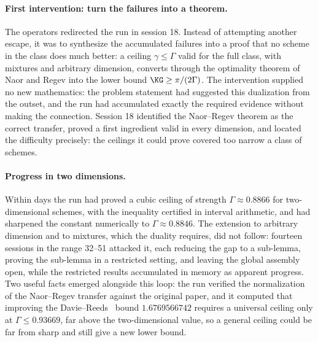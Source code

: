 \paragraph{First intervention: turn the failures into a theorem.}
The operators redirected the run in session 18. Instead of attempting another
escape, it was to synthesize the accumulated failures into a proof that no
scheme in the class does much better: a ceiling $\gamma\le\Gamma$ valid for
the full class, with mixtures and arbitrary dimension, converts through the
optimality theorem of Naor and Regev \cite{naor2014krivine} into the lower
bound $\KG\ge\pi/(2\Gamma)$. The intervention supplied no new mathematics:
the problem statement had suggested this dualization from the outset, and
the run had accumulated exactly the required evidence without making the
connection. Session 18 identified the Naor--Regev theorem as the correct
transfer, proved a first ingredient valid in every dimension, and located
the difficulty precisely: the ceilings it could prove covered too narrow a
class of schemes.

\paragraph{Progress in two dimensions.}
Within days the run had proved a cubic ceiling of strength
$\Gamma\approx0.8866$ for two-dimensional schemes, with the inequality certified in interval arithmetic, and had sharpened the
constant numerically to $\Gamma\approx0.8846$. The extension to arbitrary dimension and to mixtures, which the
duality requires, did not follow: fourteen sessions in the range 32--51
attacked it, each reducing the gap to a sub-lemma, proving the sub-lemma in
a restricted setting, and leaving the global assembly open, while the
restricted results accumulated in memory as apparent progress. Two useful
facts emerged alongside this loop: the run verified the normalization of the
Naor--Regev transfer against the original paper, and it computed that
improving the Davie--Reeds~\cite{Davie1984LowerBoundKG,Reeds1991LowerBoundKG} bound $1.6769566742$ requires a universal ceiling
only at $\Gamma\le0.93669$, far above the two-dimensional value, so a
general ceiling could be far from sharp and still give a new lower bound.

